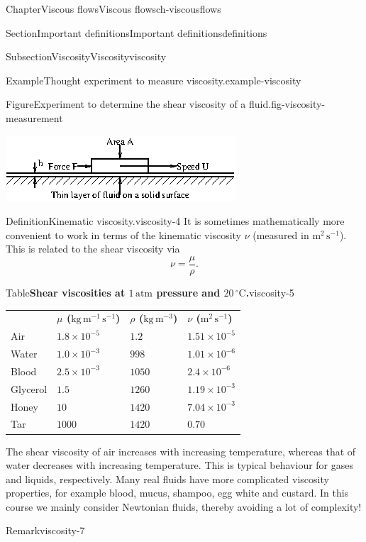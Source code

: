 \documentclass[oneside,10pt,]{book}
\newcommand{\tabularfont}{\relax}
\numberwithin{equation}{section}
\begin{document}
\begin{chapterptx}{Chapter}{Viscous flows}{}{Viscous flows}{}{}{ch-viscousflows}
\begin{sectionptx}{Section}{Important definitions}{}{Important definitions}{}{}{definitions}
\begin{subsectionptx}{Subsection}{Viscosity}{}{Viscosity}{}{}{viscosity}
\begin{example}{Example}{Thought experiment to measure viscosity.}{example-viscosity}
\begin{figureptx}{Figure}{Experiment to determine the shear viscosity of a fluid.}{fig-viscosity-measurement}{}
\begin{image}{0.2}{0.6}{0.2}{}%
\includegraphics[width=\linewidth]{external/ch-chapter07-viscosity-measurement.png}
\end{image}%
\tcblower
\end{figureptx}%
\end{example}
\begin{definition}{Definition}{Kinematic viscosity.}{viscosity-4}%
It is sometimes mathematically more convenient to work in terms of the kinematic viscosity \(\nu\) (measured in \(\mathrm{m^2\,s^{-1}}\)). This is related to the shear viscosity via%
\begin{equation*}
\nu = \frac{\mu}{\rho}.
\end{equation*}
%
\end{definition}
\begin{tableptx}{Table}{\textbf{Shear viscosities at \(1\,\mathrm{atm}\) pressure and \(20\,^\circ\mathrm{C}\).}}{viscosity-5}{}%
\centering%
{\tabularfont%
\begin{tabular}{llll}
{\bfseries{}}&{\bfseries{}\(\mu\) (\(\mathrm{kg\,m^{-1}\,s^{-1}}\))}&{\bfseries{}\(\rho\) (\(\mathrm{kg\,m^{-3}}\))}&{\bfseries{}\(\nu\) (\(\mathrm{m^2\,s^{-1}}\))}\tabularnewline[0pt]
Air&\(1.8\times 10^{-5}\)&\(1.2\)&\(1.51\times 10^{-5}\)\tabularnewline[0pt]
Water&\(1.0\times 10^{-3}\)&\(998\)&\(1.01\times 10^{-6}\)\tabularnewline[0pt]
Blood&\(2.5\times 10^{-3}\)&\(1050\)&\(2.4\times 10^{-6}\)\tabularnewline[0pt]
Glycerol&\(1.5\)&\(1260\)&\(1.19\times 10^{-3}\)\tabularnewline[0pt]
Honey&\(10\)&\(1420\)&\(7.04\times 10^{-3}\)\tabularnewline[0pt]
Tar&\(1000\)&\(1420\)&\(0.70\)
\end{tabular}
}%
\end{tableptx}%
The shear viscosity of air increases with increasing temperature, whereas that of water decreases with increasing temperature. This is typical behaviour for gases and liquids, respectively. Many real fluids have more complicated viscosity properties, for example blood, mucus, shampoo, egg white and custard. In this course we mainly consider Newtonian fluids, thereby avoiding a lot of complexity!%
\begin{remark}{Remark}{}{viscosity-7}%

\end{remark}
\end{subsectionptx}
\end{sectionptx}
\end{chapterptx}
\end{document}
